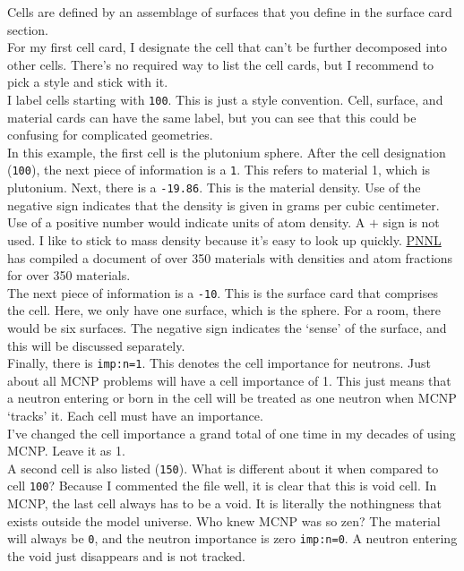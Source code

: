 \documentclass[11pt,a4paper]{article}
\begin{document}
\noindent Cells are defined by an assemblage of surfaces that you define in the surface card section.\\

\noindent For my first cell card, I designate the cell that can't be further decomposed into other cells. There's no required way to list the cell cards, but I recommend to pick a style and stick with it. \\

\noindent I label cells starting with \texttt{100}. This is just a style convention. Cell, surface, and material cards can have the same label, but you can see that this could be confusing for complicated geometries. \\

\noindent In this example, the first cell is the plutonium sphere. After the cell designation (\texttt{100}), the next piece of information is a \texttt{1}. This refers to material 1, which is plutonium. Next, there is a \texttt{-19.86}. This is the material density. Use of the negative sign indicates that the density is given in grams per cubic centimeter. Use of a positive number would indicate units of atom density. A $+$ sign is not used. I like to stick to mass density because it's easy to look up
quickly. \href{https://www.pnnl.gov/main/publications/external/technical_reports/PNNL-15870Rev1.pdf}{PNNL} has compiled a document of over 350 materials with densities and atom fractions for over 350 materials. \\

\noindent The next piece of information is a \texttt{-10}. This is the surface card that comprises the cell. Here, we only have one surface, which is the sphere. For a room, there would be six surfaces. The negative sign indicates the `sense' of the surface, and this will be discussed separately. \\

\noindent Finally, there is \texttt{imp:n=1}. This denotes the cell importance for neutrons. Just about all MCNP problems will have a cell importance of 1. This just means that a neutron entering or born in the cell will be treated as one neutron when MCNP `tracks' it. Each cell must have an importance. \\

\noindent I've changed the cell importance a grand total of one time in my decades of using MCNP. Leave it as 1. \\

\noindent A second cell is also listed (\texttt{150}). What is different about it when compared to cell \texttt{100}? Because I commented the file well, it is clear that this is void cell. In MCNP, the last cell always has to be a void. It is literally the nothingness that exists outside the model universe. Who knew MCNP was so zen? The material will always be \texttt{0}, and the neutron importance is zero \texttt{imp:n=0}. A neutron entering the void just disappears and is not
tracked. \\
\end{document}
